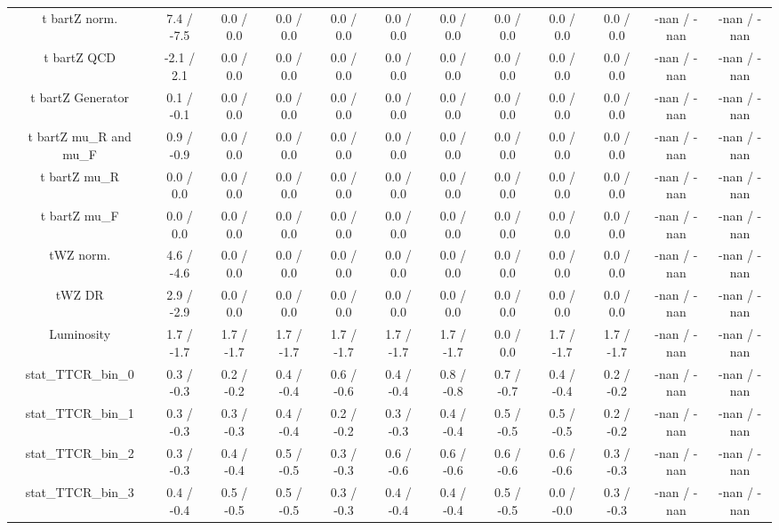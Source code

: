 \begin{table}[htbp]
\begin{center}
\begin{tabular}{|c|c|c|c|c|c|c|c|c|c|c|c|}
  t bar{t}Z norm. & 7.4 / -7.5 & 0.0 / 0.0 & 0.0 / 0.0 & 0.0 / 0.0 & 0.0 / 0.0 & 0.0 / 0.0 & 0.0 / 0.0 & 0.0 / 0.0 & 0.0 / 0.0 & -nan / -nan & -nan / -nan \\ 
  t bar{t}Z QCD & -2.1 / 2.1 & 0.0 / 0.0 & 0.0 / 0.0 & 0.0 / 0.0 & 0.0 / 0.0 & 0.0 / 0.0 & 0.0 / 0.0 & 0.0 / 0.0 & 0.0 / 0.0 & -nan / -nan & -nan / -nan \\ 
  t bar{t}Z Generator & 0.1 / -0.1 & 0.0 / 0.0 & 0.0 / 0.0 & 0.0 / 0.0 & 0.0 / 0.0 & 0.0 / 0.0 & 0.0 / 0.0 & 0.0 / 0.0 & 0.0 / 0.0 & -nan / -nan & -nan / -nan \\ 
  t bar{t}Z  mu_{R} and  mu_{F} & 0.9 / -0.9 & 0.0 / 0.0 & 0.0 / 0.0 & 0.0 / 0.0 & 0.0 / 0.0 & 0.0 / 0.0 & 0.0 / 0.0 & 0.0 / 0.0 & 0.0 / 0.0 & -nan / -nan & -nan / -nan \\ 
  t bar{t}Z  mu_{R} & 0.0 / 0.0 & 0.0 / 0.0 & 0.0 / 0.0 & 0.0 / 0.0 & 0.0 / 0.0 & 0.0 / 0.0 & 0.0 / 0.0 & 0.0 / 0.0 & 0.0 / 0.0 & -nan / -nan & -nan / -nan \\ 
  t bar{t}Z  mu_{F} & 0.0 / 0.0 & 0.0 / 0.0 & 0.0 / 0.0 & 0.0 / 0.0 & 0.0 / 0.0 & 0.0 / 0.0 & 0.0 / 0.0 & 0.0 / 0.0 & 0.0 / 0.0 & -nan / -nan & -nan / -nan \\ 
  tWZ norm. & 4.6 / -4.6 & 0.0 / 0.0 & 0.0 / 0.0 & 0.0 / 0.0 & 0.0 / 0.0 & 0.0 / 0.0 & 0.0 / 0.0 & 0.0 / 0.0 & 0.0 / 0.0 & -nan / -nan & -nan / -nan \\ 
  tWZ DR & 2.9 / -2.9 & 0.0 / 0.0 & 0.0 / 0.0 & 0.0 / 0.0 & 0.0 / 0.0 & 0.0 / 0.0 & 0.0 / 0.0 & 0.0 / 0.0 & 0.0 / 0.0 & -nan / -nan & -nan / -nan \\ 
  Luminosity & 1.7 / -1.7 & 1.7 / -1.7 & 1.7 / -1.7 & 1.7 / -1.7 & 1.7 / -1.7 & 1.7 / -1.7 & 0.0 / 0.0 & 1.7 / -1.7 & 1.7 / -1.7 & -nan / -nan & -nan / -nan \\ 
 stat_TTCR_bin_0 & 0.3 / -0.3 & 0.2 / -0.2 & 0.4 / -0.4 & 0.6 / -0.6 & 0.4 / -0.4 & 0.8 / -0.8 & 0.7 / -0.7 & 0.4 / -0.4 & 0.2 / -0.2 & -nan / -nan & -nan / -nan \\ 
 stat_TTCR_bin_1 & 0.3 / -0.3 & 0.3 / -0.3 & 0.4 / -0.4 & 0.2 / -0.2 & 0.3 / -0.3 & 0.4 / -0.4 & 0.5 / -0.5 & 0.5 / -0.5 & 0.2 / -0.2 & -nan / -nan & -nan / -nan \\ 
 stat_TTCR_bin_2 & 0.3 / -0.3 & 0.4 / -0.4 & 0.5 / -0.5 & 0.3 / -0.3 & 0.6 / -0.6 & 0.6 / -0.6 & 0.6 / -0.6 & 0.6 / -0.6 & 0.3 / -0.3 & -nan / -nan & -nan / -nan \\ 
 stat_TTCR_bin_3 & 0.4 / -0.4 & 0.5 / -0.5 & 0.5 / -0.5 & 0.3 / -0.3 & 0.4 / -0.4 & 0.4 / -0.4 & 0.5 / -0.5 & 0.0 / -0.0 & 0.3 / -0.3 & -nan / -nan & -nan / -nan \\ 

\end{tabular}
\end{center}
\end{table}
